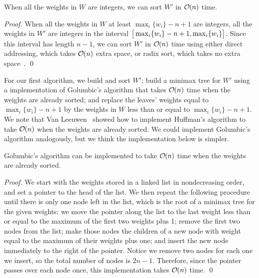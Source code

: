 \documentclass[runningheads]{llncs}
\newcommand{\Oh}[1]
    {\ensuremath{\mathcal{O} \hspace{-.5ex} \left( {#1} \right)}}
\begin{document}
\begin{corollary} \label{cor:sorting}
When all the weights in $W$ are integers, we can sort $W'$ in $\Oh{n}$ time.
\end{corollary}

\begin{proof}
When all the weights in $W$ at least \(\max_i \{w_i\} - n + 1\) are integers, all the weights in $W'$ are integers in the interval \(\left[ \rule{0ex}{2ex} \max_i \{w_i\} - n + 1, \max_i \{w_i\} \right]\).  Since this interval has length \(n - 1\), we can sort $W'$ in $\Oh{n}$ time using either direct addressing, which takes $\Oh{n}$ extra space, or radix sort, which takes no extra space~\cite{FMP07}. \qed
\end{proof}

For our first algorithm, we build and sort $W'$; build a minimax tree for $W'$ using a implementation of Golumbic's algorithm that takes $\Oh{n}$ time when the weights are already sorted; and replace the leaves' weights equal to \(\max_i \{w_i\} - n + 1\) by the weights in $W$ less than or equal to \(\max_i \{w_i\} - n + 1\).  We note that Van Leeuwen~\cite{VLe76} showed how to implement Huffman's algorithm to take $\Oh{n}$ when the weights are already sorted.  We could implement Golumbic's algorithm analogously, but we think the implementation below is simpler.

\begin{lemma} \label{lem:sorted}
Golumbic's algorithm can be implemented to take $\Oh{n}$ time when the weights are already sorted.
\end{lemma}

\begin{proof}
We start with the weights stored in a linked list in nondecreasing order, and set a pointer to the head of the list.  We then repeat the following procedure until there is only one node left in the list, which is the root of a minimax tree for the given weights: we move the pointer along the list to the last weight less than or equal to the maximum of the first two weights plus 1; remove the first two nodes from the list; make those nodes the children of a new node with weight equal to the maximum of their weights plus one; and insert the new node immediately to the right of the pointer.  Notice we remove two nodes for each one we insert, so the total number of nodes is \(2 n - 1\).  Therefore, since the pointer passes over each node once, this implementation takes $\Oh{n}$ time.
\qed
\end{proof}
\end{document}
